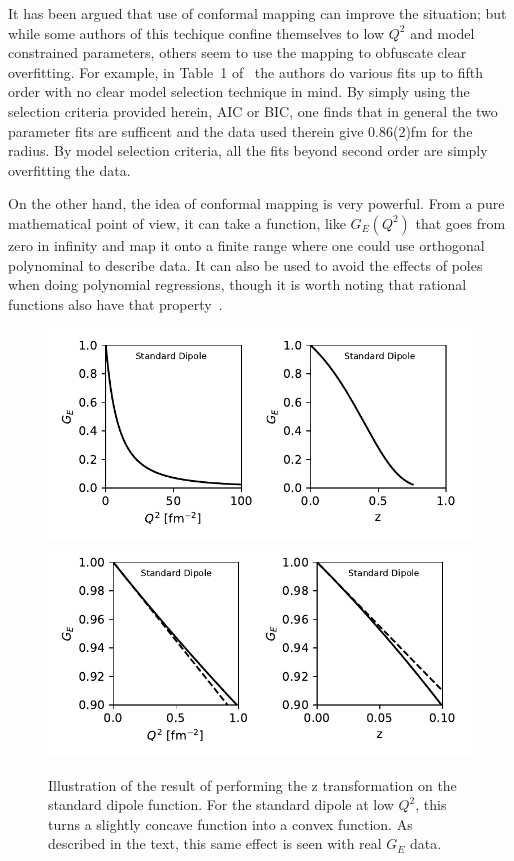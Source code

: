 \documentclass[10pt,aps,prc,twocolumn]{revtex4-1}
\begin{document}
\begin{appendix}
It has been argued that use of conformal mapping can improve the situation; but while some authors of this
techique confine themselves to low $Q^2$ and model constrained parameters, others seem to use the
mapping to obfuscate clear overfitting.    
For example, in Table~1 of~\cite{Hill:2010yb}
the authors do various fits up to fifth order with no clear model selection technique in mind.
By simply using the selection criteria provided herein, AIC or BIC, one finds that
in general the two parameter fits are sufficent and the data used therein 
give 0.86(2)fm for the radius.   By model selection criteria, all the fits beyond second 
order are simply overfitting the data.   

On the other hand, the idea of conformal mapping is very powerful.   From a pure mathematical point
of view, it can take a function, like $G_E(Q^2)$ that goes from zero in infinity and map it onto a
finite range where one could use orthogonal polynominal to describe data.   It can also be used to
avoid the effects of poles when doing polynomial regressions, though it is worth noting
that rational functions also have that property~\cite{NR}.

\begin{figure}
\includegraphics[width=\columnwidth]{Figure/z-q2-sd.pdf}
\includegraphics[width=\columnwidth]{Figure/z-q2-sd-zoomed.pdf}
\caption{Illustration of the result of performing the z transformation on the standard dipole function. 
For the standard dipole at low $Q^2$, this turns a slightly concave function into a convex function.
As described in the text, this same effect is seen with real $G_E$ data.}
\end{figure}


\end{appendix}
\end{document}
